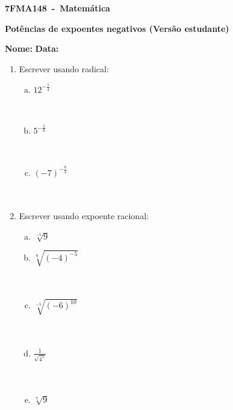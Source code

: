 \documentclass[a4paper,14pt]{article}
\begin{document}
	
	\noindent\textbf{7FMA148~-~Matemática} 
	
	\begin{center}
		\textbf{Potências de expoentes negativos (Versão estudante)}
	\end{center}
	
	
	\noindent\textbf{Nome:} \underline{\hspace{10cm}}
    \noindent\textbf{Data:} \underline{\hspace{4cm}}
	
	
	\begin{multicols}{2}
	\begin{enumerate}	
		\item Escrever usando radical:
		\begin{enumerate}[a)]
			\item $12^{-\frac{1}{4}}$ \\\\\\
			\item $5^{-\frac{5}{6}}$ \\\\\\
			\item $(-7)^{-\frac{8}{3}}$ \\\\\\
	    \end{enumerate}
        \item Escrever usando expoente racional:
        \begin{enumerate}[a)]
        	\item $\sqrt[-5]{9}$ \\
        	\item $\sqrt[9]{(-4)^{-5}}$ \\\\\\
        	\item $\sqrt[-5]{(-6)^{10}}$ \\\\\\
        	\item $\frac{1}{\sqrt{4^5}}$ \\\\\\
        	\item $\sqrt[7]{9}$ \\\\\\

\end{enumerate}
\end{enumerate}
\end{multicols}
\end{document}
